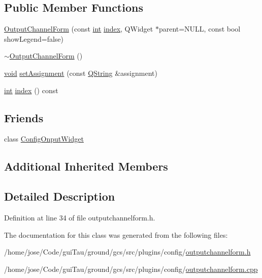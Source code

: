 \subsection*{Public Member Functions}
\begin{DoxyCompactItemize}
\item 
\hyperlink{group___config_plugin_ga5b19b5a7b71ecffbf0b3f5ac2cbae18d}{Output\-Channel\-Form} (const \hyperlink{ioapi_8h_a787fa3cf048117ba7123753c1e74fcd6}{int} \hyperlink{glext_8h_ab47dd9958bcadea08866b42bf358e95e}{index}, Q\-Widget $\ast$parent=N\-U\-L\-L, const bool show\-Legend=false)
\item 
\hyperlink{group___config_plugin_ga6b25b9aa17895f0d557626e4dea077dd}{$\sim$\-Output\-Channel\-Form} ()
\item 
\hyperlink{group___u_a_v_objects_plugin_ga444cf2ff3f0ecbe028adce838d373f5c}{void} \hyperlink{group___config_plugin_gacdf981958669fa47fe697e39fa529a16}{set\-Assignment} (const \hyperlink{group___u_a_v_objects_plugin_gab9d252f49c333c94a72f97ce3105a32d}{Q\-String} \&assignment)
\item 
\hyperlink{ioapi_8h_a787fa3cf048117ba7123753c1e74fcd6}{int} \hyperlink{group___config_plugin_ga04c058165995634381c105cad76f4209}{index} () const 
\end{DoxyCompactItemize}
\subsection*{Friends}
\begin{DoxyCompactItemize}
\item 
class \hyperlink{group___config_plugin_ga92a68401074780ed6cadf27f127892e3}{Config\-Onput\-Widget}
\end{DoxyCompactItemize}
\subsection*{Additional Inherited Members}


\subsection{Detailed Description}


Definition at line 34 of file outputchannelform.\-h.



The documentation for this class was generated from the following files\-:\begin{DoxyCompactItemize}
\item 
/home/jose/\-Code/gui\-Tau/ground/gcs/src/plugins/config/\hyperlink{outputchannelform_8h}{outputchannelform.\-h}\item 
/home/jose/\-Code/gui\-Tau/ground/gcs/src/plugins/config/\hyperlink{outputchannelform_8cpp}{outputchannelform.\-cpp}\end{DoxyCompactItemize}
